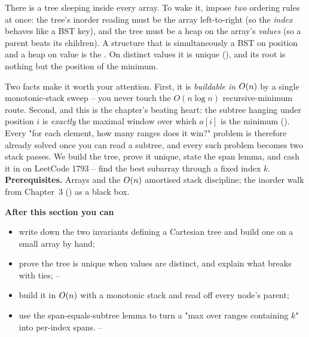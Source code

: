 \begin{topicintro}
There is a tree sleeping inside every array. To wake it, impose \emph{two} ordering rules at once: the
tree's inorder reading must be the array left-to-right (so the \emph{index} behaves like a BST key),
and the tree must be a heap on the array's \emph{values} (so a parent beats its children). A structure
that is simultaneously a BST on position and a heap on value is the . On distinct
values it is unique (), and its root is nothing but the position of the minimum.

Two facts make it worth your attention. First, it is \emph{buildable in }$O(n)$ by a single
monotonic-stack sweep -- you never touch the $O(n\log n)$ recursive-minimum route. Second, and this is
the chapter's beating heart: the subtree hanging under position $i$ is \emph{exactly} the maximal
window over which $a[i]$ is the minimum (). Every "for each element, how many ranges
does it win?" problem is therefore already solved once you can read a subtree, and every such problem
becomes two stack passes. We build the tree, prove it unique, state the span lemma, and cash it in on
LeetCode 1793 -- find the best subarray through a fixed index $k$.
\textbf{Prerequisites.} Arrays and the $O(n)$ amortised stack discipline; the inorder walk from
Chapter~3 () as a black box.

\textbf{After this section you can}
\begin{itemize}[nosep]
  \item write down the two invariants defining a Cartesian tree and build one on a small array by hand; \hfill{}
  \item prove the tree is unique when values are distinct, and explain what breaks with ties; \hfill{}--
  \item build it in $O(n)$ with a monotonic stack and read off every node's parent; \hfill{}
  \item use the span-equals-subtree lemma to turn a "max over ranges containing $k$" into per-index spans. \hfill{}--
\end{itemize}
\end{topicintro}

